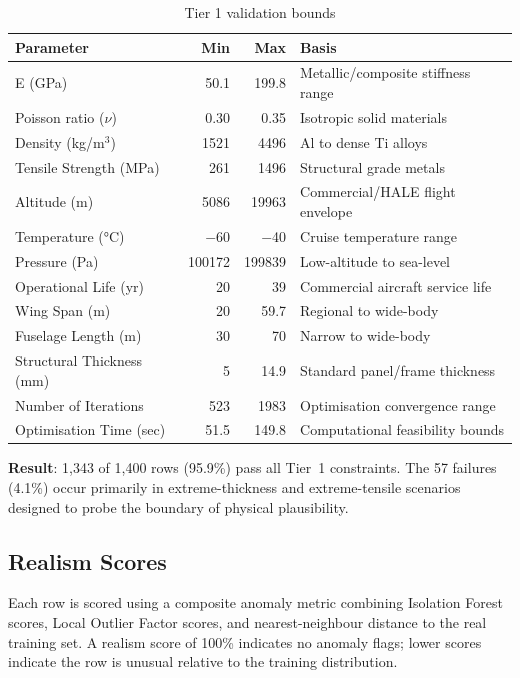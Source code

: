 \documentclass[12pt,a4paper]{article}
\begin{document}
\begin{table}[H]
\centering
\caption{Tier 1 validation bounds}
\label{tab:tier1}
\renewcommand{\arraystretch}{1.15}
\begin{tabular}{lrrl}
\toprule
\textbf{Parameter} & \textbf{Min} & \textbf{Max} & \textbf{Basis} \\
\midrule
E (GPa)                    & 50.1    & 199.8   & Metallic/composite stiffness range \\
Poisson ratio ($\nu$)      & 0.30    & 0.35    & Isotropic solid materials \\
Density (kg/m$^3$)         & 1521    & 4496    & Al to dense Ti alloys \\
Tensile Strength (MPa)     & 261     & 1496    & Structural grade metals \\
Altitude (m)               & 5086    & 19963   & Commercial/HALE flight envelope \\
Temperature (°C)           & $-$60   & $-$40   & Cruise temperature range \\
Pressure (Pa)              & 100172  & 199839  & Low-altitude to sea-level \\
Operational Life (yr)      & 20      & 39      & Commercial aircraft service life \\
Wing Span (m)              & 20      & 59.7    & Regional to wide-body \\
Fuselage Length (m)        & 30      & 70      & Narrow to wide-body \\
Structural Thickness (mm)  & 5       & 14.9    & Standard panel/frame thickness \\
Number of Iterations       & 523     & 1983    & Optimisation convergence range \\
Optimisation Time (sec)    & 51.5    & 149.8   & Computational feasibility bounds \\
\bottomrule
\end{tabular}
\end{table}

\textbf{Result}: 1,343 of 1,400 rows (95.9\%) pass all Tier~1 constraints. The 57 failures (4.1\%) occur primarily in extreme-thickness and extreme-tensile scenarios designed to probe the boundary of physical plausibility.

\subsection{Realism Scores}

Each row is scored using a composite anomaly metric combining Isolation Forest scores, Local Outlier Factor scores, and nearest-neighbour distance to the real training set. A realism score of 100\% indicates no anomaly flags; lower scores indicate the row is unusual relative to the training distribution.
\end{document}
